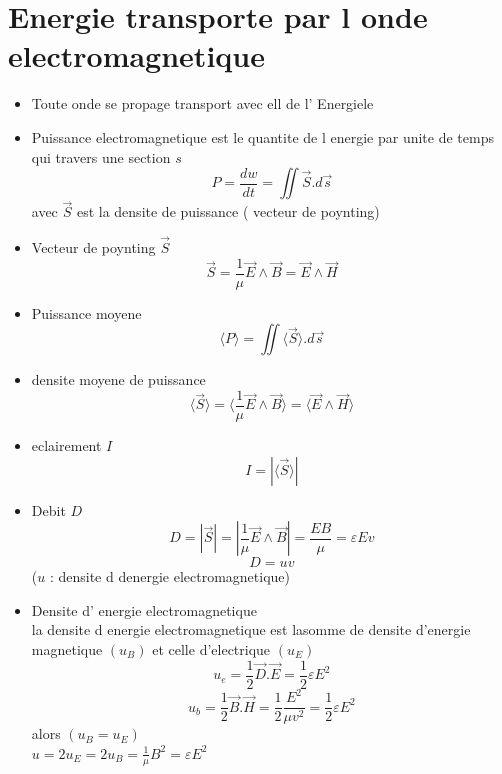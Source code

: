 \documentclass[12pt]{book}
\begin{document}
        \section{Energie transporte par l onde electromagnetique}
            \begin{itemize}
                \item Toute onde se propage transport avec ell de l' Energiele 
                \item Puissance electromagnetique est le quantite de l energie par unite de temps qui travers une section $s$
                    \[ P = \frac{dw}{dt} = \iint \vec{S}.d\vec{s}\] avec $\vec{S}$ est la densite de puissance ( vecteur de poynting)
                \item Vecteur de poynting $\vec{S}$ \[ \vec{S} = \frac{1}{\mu}\vec{E}\wedge\vec{B} = \vec{E}\wedge\vec{H} \]
                \item Puissance moyene \[ \langle P \rangle  =\iint \langle \vec{S}\rangle .d\vec{s}\]
                \item densite moyene de puissance \[ \langle \vec{S} \rangle  = \langle \frac{1}{\mu}\vec{E}\wedge\vec{B} \rangle = \langle \vec{E}\wedge\vec{H} \rangle \]
                \item eclairement $I$ \[ I = | \langle \vec{S} \rangle| \]
                \item Debit $D$ \[ D = |\vec{S}| = |\frac{1}{\mu}\vec{E}\wedge\vec{B}| =\frac{EB}{\mu} = \varepsilon E v\] 
                    \[D =uv\] ($u$ : densite d denergie electromagnetique)
                \item Densite d' energie electromagnetique \\
                    la densite d energie electromagnetique est lasomme de densite d'energie magnetique $(u_B)$ et celle d'electrique $(u_E)$
                    \[ u_e = \frac{1}{2}\vec{D}.\vec{E}=\frac{1}{2}\varepsilon E^2  \]
                    \[ u_b = \frac{1}{2}\vec{B}.\vec{H}=\frac{1}{2}\frac{E^2}{\mu v^2} = \frac{1}{2}\varepsilon E^2 \]
                    alors $(u_B = u_E)$ \\
                    $u = 2u_E=2u_B=\frac{1}{\mu}B^2 = \varepsilon E^2$

            \end{itemize}
\end{document}
